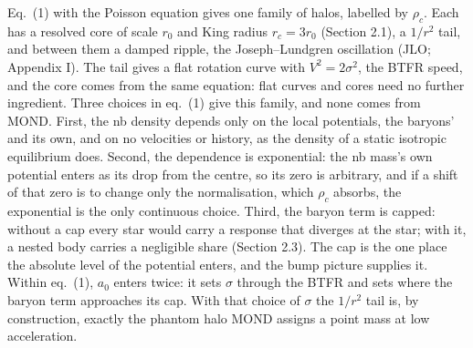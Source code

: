 \documentclass[
  10pt,
]{article}
\begin{document}
Eq.~(1) with the Poisson equation gives one family of halos, labelled by $\rho_c$. Each has a resolved core of scale $r_0$ and King radius $r_c=3r_0$ (Section 2.1), a $1/r^2$ tail, and between them a damped ripple, the Joseph--Lundgren oscillation (JLO; Appendix I). The tail gives a flat rotation curve with $V^2=2\sigma^2$, the BTFR speed, and the core comes from the same equation: flat curves and cores need no further ingredient. Three choices in eq.~(1) give this family, and none comes from MOND. First, the nb density depends only on the local potentials, the baryons' and its own, and on no velocities or history, as the density of a static isotropic equilibrium does. Second, the dependence is exponential: the nb mass's own potential enters as its drop from the centre, so its zero is arbitrary, and if a shift of that zero is to change only the normalisation, which $\rho_c$ absorbs, the exponential is the only continuous choice. Third, the baryon term is capped: without a cap every star would carry a response that diverges at the star; with it, a nested body carries a negligible share (Section 2.3). The cap is the one place the absolute level of the potential enters, and the bump picture supplies it. Within eq.~(1), $a_0$ enters twice: it sets $\sigma$ through the BTFR and sets where the baryon term approaches its cap. With that choice of $\sigma$ the $1/r^2$ tail is, by construction, exactly the phantom halo MOND assigns a point mass at low acceleration.
\end{document}
